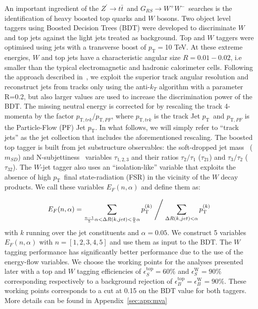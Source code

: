 \documentclass[a4paper,11pt]{article}
\newcommand*{\Zptt}{\ensuremath{Z^{\prime} \rightarrow \ttbar}}
\newcommand{\ptSub}[1]{\ensuremath{p_{\text{T} #1}}}
\newcommand{\ptSup}[1]{\ensuremath{p_{\text{T}}^{#1}}}
\newcommand{\pt}{\ensuremath{p_{\text{T}}}}
\newcommand{\mSD}{\ensuremath{m_{\ensuremath{SD}}}}
\newcommand*{\rsg}{\ensuremath{G_{RS} \rightarrow W^+W^-}}
\newcommand*{\ttbar}{\ensuremath{t\bar{t}}}
\begin{document}
An important ingredient of the \Zptt\ and \rsg\ searches is the identification of heavy boosted top quarks and $W$ bosons. Two object level taggers using Boosted Decision Trees (BDT) were developed to discriminate $W$ and top jets against the light jets treated as background. 
Top and $W$ taggers were optimised using jets with a transverse boost of $\pt=$10 TeV. At these extreme energies, $W$ and top jets have a characteristic angular size $R=0.01-0.02$, i.e smaller than the typical electromagnetic and hadronic calorimeter cells. Following the approach described in~\cite{Larkoski:2015yqa}, we exploit the superior track angular resolution and reconstruct jets from tracks only using the anti-$k_T$ algorithm with a parameter R=0.2, but also larger values are used to increase the discrimination power of the BDT. The missing neutral energy is corrected for by rescaling the track 4-momenta by the factor $\ptSub{,trk}/\ptSub{,PF}$, where $\ptSub{,trk}$ is the track Jet \pt\ and $\ptSub{,PF}$ is the Particle-Flow (PF) Jet \pt. In what follows, we will simply refer to ``track jets'' as the jet collection that includes the aforementioned rescaling.
\newline
The boosted top tagger is built from jet substructure observables: the soft-dropped jet mass~\cite{Larkoski:2014wba} (\mSD) and N-subjettiness~\cite{Thaler:2010tr} variables $\tau_{1,2,3}$ and their ratios $\tau_{2}/\tau_{1}$ ($\tau_{21}$) and $\tau_{3}/\tau_{2}$ ($\tau_{32}$). The $W$-jet tagger also uses an ``isolation-like'' variable that exploits the absence of high \pt\ final state-radiation (FSR) in the vicinity of the $W$ decay products. We call these variables $E_{F}(n,\alpha)$ and define them as:


\begin{equation}
E_{F}(n,\alpha) =  \sum \limits_{\frac{n-1}{5}\alpha < \Delta R(k,jet)< \frac{n}{5}\alpha} \ptSup{(k)} \Biggm/ \sum \limits_{\Delta R(k,jet)< \alpha} \ptSup{(k)}
\end{equation}
with $k$ running over the jet constituents and $\alpha=0.05$. We construct 5 variables $E_{F}(n,\alpha)$ with $n=[1,2,3,4,5]$ and use them as input to the BDT.
The $W$ tagging performance has significantly better performance due to the use of the energy-flow variables. We choose the working points for the analyses presented later with a top and $W$ tagging efficiencies of $\epsilon_S^{\text{top}}=60\%$ and $\epsilon_S^{\text{W}}=90\%$ corresponding respectively to a background rejection of $\epsilon_B^{\text{top}}=\epsilon_B^{\text{W}}=90\%$. These working points corresponds to a cut at 0.15 on the BDT value for both taggers. More details can be found in Appendix~\ref{sec:app:mva}
\end{document}
